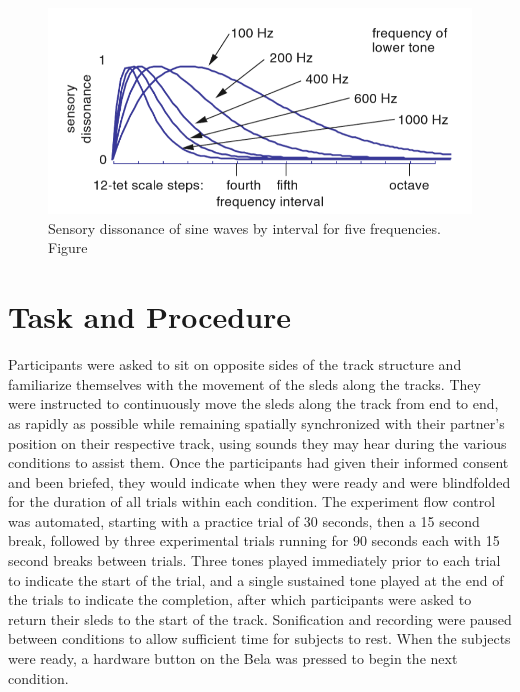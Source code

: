 \documentclass[10pt,a4paper,onecolumn]{article}
\begin{document}
\begin{figure}[h]

{\centering \includegraphics[width=1\linewidth]{figures/setharesTuningTimbreSpectrum2010_p47} 

}

\caption{Sensory dissonance of sine waves by interval for five frequencies. Figure \autocite[p.~47]{setharesSoundSound2005}}\label{fig:sensory-dissonance}
\end{figure}

\hypertarget{task-and-procedure}{%
\section{Task and Procedure}\label{task-and-procedure}}

Participants were asked to sit on opposite sides of the track structure and familiarize themselves with the movement of the sleds along the tracks. They were instructed to continuously move the sleds along the track from end to end, as rapidly as possible while remaining spatially synchronized with their partner's position on their respective track, using sounds they may hear during the various conditions to assist them. Once the participants had given their informed consent and been briefed, they would indicate when they were ready and were blindfolded for the duration of all trials within each condition. The experiment flow control was automated, starting with a practice trial of 30 seconds, then a 15 second break, followed by three experimental trials running for 90 seconds each with 15 second breaks between trials. Three tones played immediately prior to each trial to indicate the start of the trial, and a single sustained tone played at the end of the trials to indicate the completion, after which participants were asked to return their sleds to the start of the track. Sonification and recording were paused between conditions to allow sufficient time for subjects to rest. When the subjects were ready, a hardware button on the Bela was pressed to begin the next condition.
\end{document}
